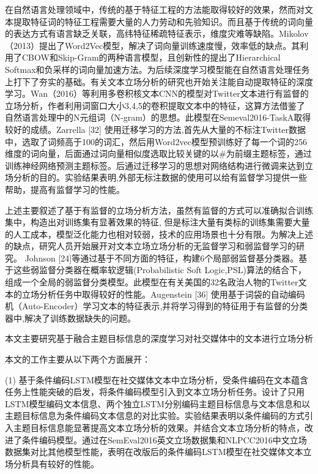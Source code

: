 在自然语言处理领域中，传统的基于特征工程的方法能取得较好的效果，然而对文本提取特征词的特征工程需要大量的人力劳动和先验知识。而且基于传统的词向量的表达方式有语言缺乏关联，高纬特征稀疏特征表示，维度灾难等缺陷。Mikolov（2013）提出了Word2Vec模型，解决了词向量训练速度慢，效率低的缺点。其利用了CBOW和Skip-Gram的两种语言模型，且创新性的提出了Hierarchical Softmax和负采样的词向量加速方法。为后续深度学习模型能在自然语言处理任务上打下了夯实的基础。有关文本立场分析的研究也开始关注能自动提取特征的深度学习。Wan（2016）等利用多卷积核文本CNN的模型对Twitter文本进行有监督的立场分析，作者利用词窗口大小3,4,5的卷积提取文本中的特征，这算方法借鉴了自然语言处理中的N元组词（N-gram）的思想。此模型在Semeval2016-TaskA取得较好的成绩。Zarrella [32] 使用迁移学习的方法,首先从大量的不标注Twitter数据中，选取了词频高于100的词汇，然后用Word2vec模型预训练好了每一个词的256维度的词向量，后面通过词向量相似度选取比较关键的以\#为前缀主题标签，通过训练神经网络预测主题标签。后通过迁移学习的思想对网络结构进行微调来达到立场分析的目的。实验结果表明,外部无标注数据的使用可以给有监督学习提供一些帮助，提高有监督学习的性能。

上述主要叙述了基于有监督的立场分析方法，虽然有监督的方式可以准确拟合训练集中，构造出对训练集有显著效果的特征, 但是标注大量有类标的训练集需要大量的人工成本，模型泛化能力也相对较弱，技术的应用场景也十分有限。为解决上述的缺点，研究人员开始展开对文本立场立场分析的无监督学习和弱监督学习的研究。 Johnson [24]等通过基于不同方面的特征，构建6个局部弱监督基分类器。基于这些弱监督分类器在概率软逻辑(Probabilistic Soft Logic,PSL)算法的结合下，组成一个全局的弱监督分类模型。此模型在有关美国的32名政治人物的Twitter文本的立场分析任务中取得较好的性能。Augenstein [36] 使用基于词袋的自动编码机（Auto-Encoder）学习文本的特征表示,并将学习得到的特征用于有监督的分类器中,解决了训练数据缺失的问题。




本文主要研究基于融合主题目标信息的深度学习对社交媒体中的文本进行立场分析

本文的工作主要从以下两个方面展开：

(1) 基于条件编码LSTM模型在社交媒体文本中立场分析，受条件编码在文本蕴含任务上性能突破的启发，将条件编码模型引入到文本立场分析任务。设计了只用LSTM模型编码文本信息、两个独立LSTM分别编码主题目标信息与文本信息和以主题目标信息为条件编码文本信息的对比实验。实验结果表明以条件编码的方式引入主题目标信息能显著提高文本立场分析的效果。并结合文本立场分析的特点，改进了条件编码模型。通过在SemEval2016英文立场数据集和NLPCC2016中文立场数据集对比其他模型性能，表明在改版后的条件编码LSTM模型在社交媒体文本立场分析具有较好的性能。

